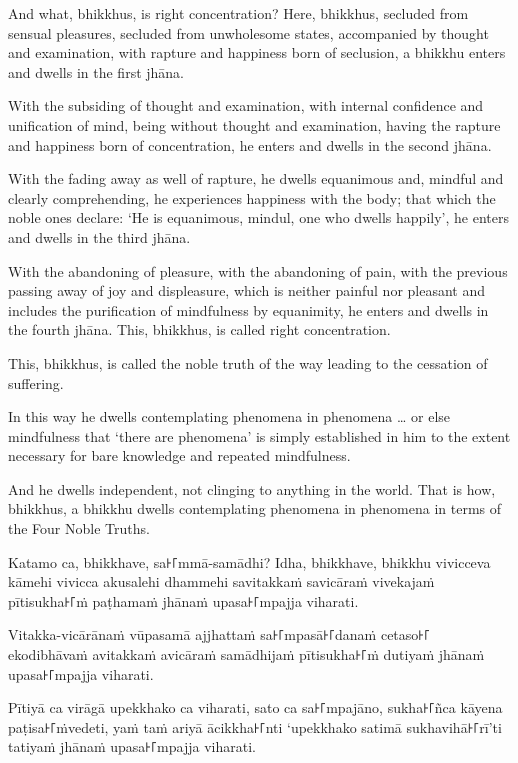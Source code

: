 And what, bhikkhus, is right concentration? Here, bhikkhus, secluded from
sensual pleasures, secluded from unwholesome states, accompanied by thought and
examination, with rapture and happiness born of seclusion, a bhikkhu enters and
dwells in the first jhāna.

With the subsiding of thought and examination, with internal confidence and
unification of mind, being without thought and examination, having the rapture
and happiness born of concentration, he enters and dwells in the second jhāna.

With the fading away as well of rapture, he dwells equanimous and, mindful and
clearly comprehending, he experiences happiness with the body; that which the
noble ones declare: `He is equanimous, mindul, one who dwells happily', he
enters and dwells in the third jhāna.

With the abandoning of pleasure, with the abandoning of pain, with the previous
passing away of joy and displeasure, which is neither painful nor pleasant and
includes the purification of mindfulness by equanimity, he enters and dwells in
the fourth jhāna. This, bhikkhus, is called right concentration.

This, bhikkhus, is called the noble truth of the way leading to the cessation of
suffering.

In this way he dwells contemplating phenomena in phenomena \ldots{} or else
mindfulness that ‘there are phenomena’ is simply established in him to the
extent necessary for bare knowledge and repeated mindfulness.

And he dwells independent, not clinging to anything in the world. That is how,
bhikkhus, a bhikkhu dwells contemplating phenomena in phenomena in terms of the
Four Noble Truths.



\paliPage

Katamo ca, bhikkhave, sa꜔꜒mmā-samādhi? Idha, bhikkhave, bhikkhu vivicceva kāmehi
vivicca akusalehi dhammehi savitakkaṁ savicāraṁ vivekajaṁ pītisukha꜔꜒ṁ paṭhamaṁ
jhānaṁ upasa꜔꜒mpajja viharati.

Vitakka-vicārānaṁ vūpasamā ajjhattaṁ sa꜔꜒mpasā꜔꜒danaṁ cetaso꜔꜒ ekodibhāvaṁ avitakkaṁ
avicāraṁ samādhijaṁ pītisukha꜔꜒ṁ dutiyaṁ jhānaṁ upasa꜔꜒mpajja viharati.

Pītiyā ca virāgā upekkhako ca viharati, sato ca sa꜔꜒mpajāno, sukha꜔꜒ñca kāyena
paṭisa꜔꜒ṁvedeti, yaṁ taṁ ariyā ācikkha꜔꜒nti ‘upekkhako satimā sukhavihā꜔꜒rī’ti tatiyaṁ
jhānaṁ upasa꜔꜒mpajja viharati.


